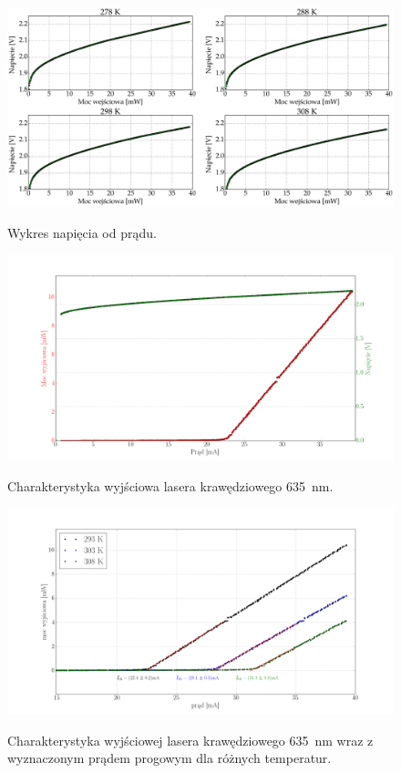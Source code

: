 \documentclass[a4paper, portrait,12pt]{mwrep}
\begin{document}
\begin{figure}
\center
  \includegraphics[scale=0.30]{plot635/plot_i_v_4.eps}
  \label{rys1}
  \caption{Wykres napięcia od prądu.} 
\end{figure}

\begin{figure}
\center
  \includegraphics[scale=0.30]{plot635/plot_ivl_20.png}
  \label{rys1}
  \caption{Charakterystyka wyjściowa lasera krawędziowego 635 \,nm.} 
\end{figure}

\begin{figure}
\center
  \includegraphics[scale=0.30]{plot635/plot_3_i_th.png}
  \label{rys1}
  \caption{Charakterystyka wyjściowej lasera krawędziowego 635 \,nm wraz z wyznaczonym prądem progowym dla różnych temperatur.} 
\end{figure}
\end{document}
